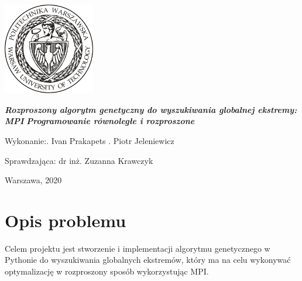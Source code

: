 \documentclass[a4paper, 12pt]{article}
\newcommand{\mainmatter}{\clearpage \cfoot{\thepage\ of \pageref{LastPage}}
\pagenumbering{arabic}}
\begin{document}
	\begin{titlepage}
\includegraphics[width = 40mm]{logo.jpg}
		\begin{center}
    			\vspace{3cm}
    					\Large\textit{\textbf{Rozproszony algorytm genetyczny  do wyszukiwania globalnej ekstremy: MPI}}
    					\Large\textit{\textbf{Programowanie równoległe i rozproszone}}
   			\vspace{4cm}
		\end{center} 

		\hfill\begin{minipage}{0.54\textwidth}
			\Large Wykonanie:. Ivan Prakapets  . Piotr Jeleniewicz 
		\vspace{\baselineskip}
		\end{minipage}
		
		\hfill\begin{minipage}{0.54\textwidth}
			\Large Sprawdzająca:\newline
		 		dr inż. Zuzanna Krawczyk
\vspace{\baselineskip}
		\end{minipage}
	
		\hfill\begin{minipage}{0.7\textwidth}
		\vspace{1cm}
			\Large Warszawa, 2020
			\vspace{\baselineskip}
		\end{minipage}
	\end{titlepage}
\newpage
\mainmatter
\setlength{\headheight}{15pt}
\doublespacing
\tableofcontents
\newpage

\linespread{0.5}

\section{Opis problemu}
\hspace*{1cm} Celem projektu jest stworzenie  i implementacji algorytmu genetycznego w Pythonie do wyszukiwania globalnych ekstremów, który ma na celu wykonywać optymalizację w rozproszony sposób wykorzystując MPI.
\end{document}
